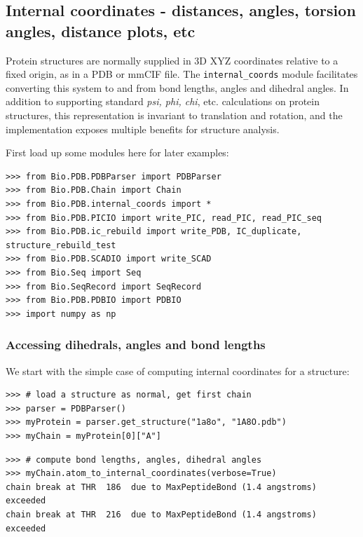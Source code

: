 \subsection{Internal coordinates - distances, angles, torsion angles, distance plots, etc}
\label{sec:internal_coordinates}

Protein structures are normally supplied in 3D XYZ coordinates relative to a fixed origin, as in a PDB or mmCIF file.
The \texttt{internal\_coords} module facilitates converting this system to and from bond lengths, angles and dihedral
angles.  In addition to supporting standard \textit{psi, phi, chi}, etc. calculations on protein structures, this
representation is invariant to translation and rotation, and the implementation exposes multiple benefits for
structure analysis.

First load up some modules here for later examples:

\begin{verbatim}
>>> from Bio.PDB.PDBParser import PDBParser
>>> from Bio.PDB.Chain import Chain
>>> from Bio.PDB.internal_coords import *
>>> from Bio.PDB.PICIO import write_PIC, read_PIC, read_PIC_seq
>>> from Bio.PDB.ic_rebuild import write_PDB, IC_duplicate, structure_rebuild_test
>>> from Bio.PDB.SCADIO import write_SCAD
>>> from Bio.Seq import Seq
>>> from Bio.SeqRecord import SeqRecord
>>> from Bio.PDB.PDBIO import PDBIO
>>> import numpy as np
\end{verbatim}

\subsubsection{Accessing dihedrals, angles and bond lengths}

We start with the simple case of computing internal coordinates for a structure:

\begin{verbatim}
>>> # load a structure as normal, get first chain
>>> parser = PDBParser()
>>> myProtein = parser.get_structure("1a8o", "1A8O.pdb")
>>> myChain = myProtein[0]["A"]
\end{verbatim}

\begin{verbatim}
>>> # compute bond lengths, angles, dihedral angles
>>> myChain.atom_to_internal_coordinates(verbose=True)
chain break at THR  186  due to MaxPeptideBond (1.4 angstroms) exceeded
chain break at THR  216  due to MaxPeptideBond (1.4 angstroms) exceeded
\end{verbatim}

